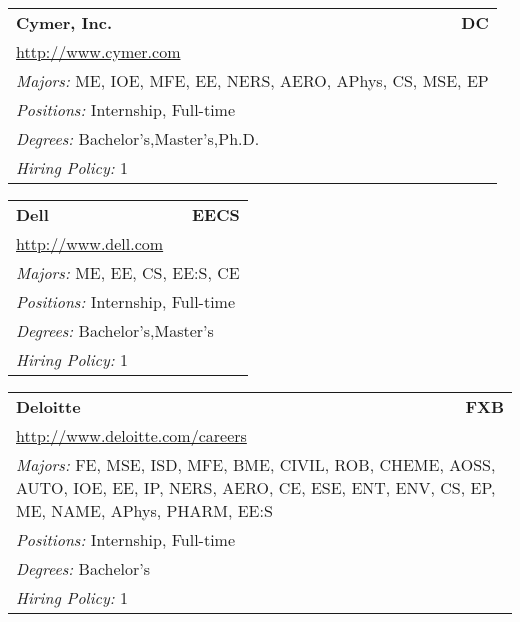 \documentclass[twoside]{article}
\begin{document}
\begin{center}
\begin{multicols}{3}
\begin{FlushLeft}
\begin{minipage}{\columnwidth}
\end{minipage}
 
\begin{minipage}{\columnwidth}\begin{tabularx}{.95\columnwidth}{Xr}
                 {\Large\bf Cymer, Inc.} & {\Large\bf DC}\\
    \multicolumn{2}{p{.95\columnwidth}}{\url{http://www.cymer.com}}\\
    \multicolumn{2}{p{.95\columnwidth}}{\emph{Majors:} ME, IOE, MFE, EE, NERS, AERO, APhys, CS, MSE, EP}\\
    \multicolumn{2}{p{.95\columnwidth}}{\emph{Positions:} Internship, Full-time}\\
    \multicolumn{2}{p{.95\columnwidth}}{\emph{Degrees:} Bachelor's,Master's,Ph.D.}\\
    \multicolumn{2}{p{.95\columnwidth}}{\emph{Hiring Policy:} 1}\\
    \end{tabularx}
    
\end{minipage}
 
\begin{minipage}{\columnwidth}\begin{tabularx}{.95\columnwidth}{Xr}
                 {\Large\bf Dell} & {\Large\bf EECS}\\
    \multicolumn{2}{p{.95\columnwidth}}{\url{http://www.dell.com}}\\
    \multicolumn{2}{p{.95\columnwidth}}{\emph{Majors:} ME, EE, CS, EE:S, CE}\\
    \multicolumn{2}{p{.95\columnwidth}}{\emph{Positions:} Internship, Full-time}\\
    \multicolumn{2}{p{.95\columnwidth}}{\emph{Degrees:} Bachelor's,Master's}\\
    \multicolumn{2}{p{.95\columnwidth}}{\emph{Hiring Policy:} 1}\\
    \end{tabularx}
    
\end{minipage}
 
\begin{minipage}{\columnwidth}\begin{tabularx}{.95\columnwidth}{Xr}
                 {\Large\bf Deloitte} & {\Large\bf FXB}\\
    \multicolumn{2}{p{.95\columnwidth}}{\url{http://www.deloitte.com/careers}}\\
    \multicolumn{2}{p{.95\columnwidth}}{\emph{Majors:} FE, MSE, ISD, MFE, BME, CIVIL, ROB, CHEME, AOSS, AUTO, IOE, EE, IP, NERS, AERO, CE, ESE, ENT, ENV, CS, EP, ME, NAME, APhys, PHARM, EE:S}\\
    \multicolumn{2}{p{.95\columnwidth}}{\emph{Positions:} Internship, Full-time}\\
    \multicolumn{2}{p{.95\columnwidth}}{\emph{Degrees:} Bachelor's}\\
    \multicolumn{2}{p{.95\columnwidth}}{\emph{Hiring Policy:} 1}\\
    \end{tabularx}
    

\end{minipage}
\end{FlushLeft}
\end{multicols}
\end{center}
\end{document}
